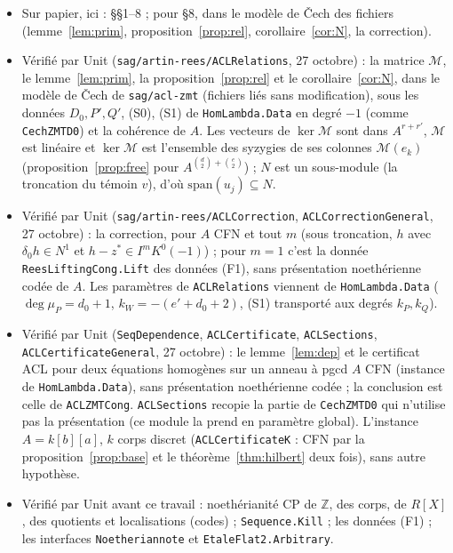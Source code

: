 \documentclass[11pt]{amsart}
\theoremstyle{definition}
\theoremstyle{remark}
\newcommand{\sm}{\mathrm{span}}
\begin{document}
\begin{itemize}
\item Sur papier, ici : \S\S1--8 ; pour \S8, dans le modèle de Čech des
  fichiers (lemme~\ref{lem:prim}, proposition~\ref{prop:rel},
  corollaire~\ref{cor:N}, la correction).
\item Vérifié par Unit (\texttt{sag/artin-rees/ACLRelations}, 27 octobre) :
  la matrice $\mathcal M$, le lemme~\ref{lem:prim}, la
  proposition~\ref{prop:rel} et le corollaire~\ref{cor:N}, dans le modèle
  de Čech de \texttt{sag/acl-zmt} (fichiers liés sans modification), sous
  les données $D_0,P',Q'$, (S0), (S1) de \texttt{HomLambda.Data} en
  degré $-1$ (comme \texttt{CechZMTD0}) et la cohérence de $A$. Les
  vecteurs de $\ker\mathcal M$ sont dans $A^{r+r'}$, $\mathcal M$ est
  linéaire et $\ker\mathcal M$ est l'ensemble des syzygies de ses colonnes
  $\mathcal M(e_k)$ (proposition~\ref{prop:free} pour
  $A^{\binom d2+\binom e2}$) ; $N$ est un sous-module (la troncation du
  témoin $v$), d'où $\sm(u_j)\subseteq N$.
\item Vérifié par Unit (\texttt{sag/artin-rees/ACLCorrection},
  \texttt{ACLCorrectionGeneral}, 27 octobre) : la correction, pour $A$
  CFN et tout $m$ (sous troncation, $h$ avec $\delta_0h\in N^1$ et
  $h-z^*\in I^mK^0(-1)$) ; pour $m=1$ c'est la donnée
  \texttt{ReesLiftingCong.Lift} des données (F1), sans présentation
  noethérienne codée de $A$. Les paramètres de \texttt{ACLRelations}
  viennent de \texttt{HomLambda.Data} ($\deg\mu_P=d_0+1$,
  $k_W=-(e'+d_0+2)$, (S1) transporté aux degrés $k_P,k_Q$).
\item Vérifié par Unit (\texttt{SeqDependence}, \texttt{ACLCertificate},
  \texttt{ACLSections}, \texttt{ACLCertificateGeneral}, 27 octobre) : le
  lemme~\ref{lem:dep} et le certificat ACL pour deux équations homogènes
  sur un anneau à pgcd $A$ CFN (instance de \texttt{HomLambda.Data}),
  sans présentation noethérienne codée ; la conclusion est celle de
  \texttt{ACLZMTCong}. \texttt{ACLSections} recopie la partie de
  \texttt{CechZMTD0} qui n'utilise pas la présentation (ce module la prend
  en paramètre global). L'instance $A=k[b][a]$, $k$ corps discret
  (\texttt{ACLCertificateK} : CFN par la proposition~\ref{prop:base} et le
  théorème~\ref{thm:hilbert} deux fois), sans autre hypothèse.
\item Vérifié par Unit avant ce travail : noethérianité CP de $\mathbb Z$,
  des corps, de $R[X]$, des quotients et localisations (codes) ;
  \texttt{Sequence.Kill} ; les données (F1) ; les interfaces
  \texttt{Noetheriannote} et \texttt{EtaleFlat2.Arbitrary}.

\end{itemize}
\end{document}
